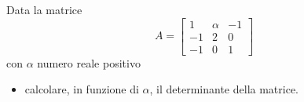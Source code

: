 Data la matrice
\[
A=\left[
\begin{array}{ccc}
1 & \alpha & -1 \\
-1 & 2 & 0\\
-1 & 0 & 1
\end{array}\right]
\]
 con $\alpha$ numero reale positivo
 \begin {itemize}
 \item calcolare, in funzione di  $\alpha$, il determinante della
 matrice.
\end{itemize}
